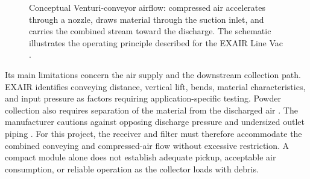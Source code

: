 \begin{figure}[H]
\centering
{}
\caption[Venturi conveyor airflow principle]{Conceptual Venturi-conveyor airflow: compressed air accelerates through a nozzle, draws material through the suction inlet, and carries the combined stream toward the discharge. The schematic illustrates the operating principle described for the EXAIR Line Vac \citep{exairLineVacCatalog}.}
\label{fig:EXAIR Compressed Air}
\end{figure}

Its main limitations concern the air supply and the downstream collection path. EXAIR identifies conveying distance, vertical lift, bends, material characteristics, and input pressure as factors requiring application-specific testing. Powder collection also requires separation of the material from the discharged air \citep{exairLineVacFAQ}. The manufacturer cautions against opposing discharge pressure and undersized outlet piping \citep{evans2013LineVacBackPressure}. For this project, the receiver and filter must therefore accommodate the combined conveying and compressed-air flow without excessive restriction. A compact module alone does not establish adequate pickup, acceptable air consumption, or reliable operation as the collector loads with debris.

